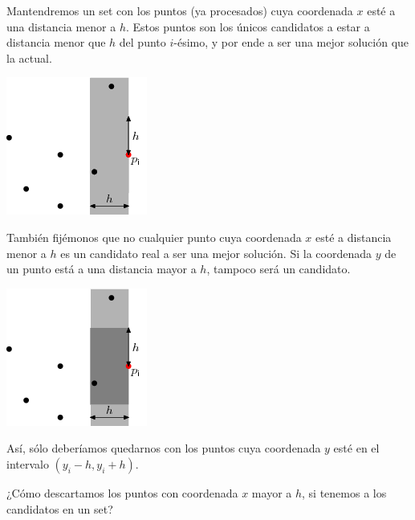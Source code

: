 \documentclass[compress]{beamer}
\newcommand{\bigpause}{\bigskip \pause}
\begin{document}
\begin{frame}

Mantendremos un set con los puntos (ya procesados) cuya coordenada $x$ est\'e a una distancia menor a $h$. 
Estos puntos son los \'unicos candidatos a estar a distancia menor que $h$ del punto $i$-\'esimo, y por ende a ser una mejor soluci\'on que la actual. \bigskip

\begin{center}
\includegraphics[scale=0.6]{images/closest2.png}
\end{center}

\end{frame}

\begin{frame}
Tambi\'en fij\'emonos que no cualquier punto cuya coordenada $x$ est\'e a distancia menor a $h$ es un candidato real 
a ser una mejor soluci\'on. Si la coordenada $y$ de un punto est\'a a una distancia mayor a $h$, tampoco ser\'a un candidato. 

\begin{center}
\includegraphics[scale=0.6]{images/closest.png}
\end{center}

\end{frame}

\begin{frame}
As\'i, s\'olo deber\'iamos quedarnos con los puntos cuya coordenada $y$ est\'e en el intervalo $(y_i-h,y_i+h)$. \bigskip

¿C\'omo descartamos los puntos con coordenada $x$ mayor a $h$, si tenemos a los candidatos en un set? \bigpause

\end{frame}
\end{document}

